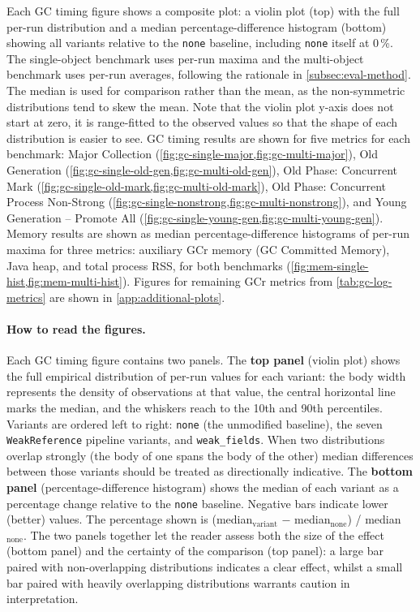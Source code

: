 Each \ac{GC} timing figure shows a composite plot: a violin plot (top) with the full per-run distribution and a median percentage-difference histogram (bottom) showing all variants relative to the \texttt{none} baseline, including \texttt{none} itself at 0\,\%. The single-object benchmark uses per-run maxima and the multi-object benchmark uses per-run averages, following the rationale in \cref{subsec:eval-method}. The median is used for comparison rather than the mean, as the non-symmetric distributions tend to skew the mean. Note that the violin plot y-axis does not start at zero, it is range-fitted to the observed values so that the shape of each distribution is easier to see. \ac{GC} timing results are shown for five metrics for each benchmark: Major Collection (\cref{fig:gc-single-major,fig:gc-multi-major}), Old Generation (\cref{fig:gc-single-old-gen,fig:gc-multi-old-gen}), Old Phase: Concurrent Mark (\cref{fig:gc-single-old-mark,fig:gc-multi-old-mark}), Old Phase: Concurrent Process Non-Strong (\cref{fig:gc-single-nonstrong,fig:gc-multi-nonstrong}), and Young Generation -- Promote All (\cref{fig:gc-single-young-gen,fig:gc-multi-young-gen}). Memory results are shown as median percentage-difference histograms of per-run maxima for three metrics: auxiliary \ac{GCr} memory (GC Committed Memory), Java heap, and total process \ac{RSS}, for both benchmarks (\cref{fig:mem-single-hist,fig:mem-multi-hist}). Figures for remaining \ac{GCr} metrics from \cref{tab:gc-log-metrics} are shown in \cref{app:additional-plots}.

\paragraph{How to read the figures.}
Each \ac{GC} timing figure contains two panels. The \textbf{top panel} (violin plot) shows the full empirical distribution of per-run values for each variant: the body width represents the density of observations at that value, the central horizontal line marks the median, and the whiskers reach to the 10th and 90th percentiles. Variants are ordered left to right: \texttt{none} (the unmodified baseline), the seven \texttt{WeakReference} pipeline variants, and \texttt{weak\_fields}. When two distributions overlap strongly (the body of one spans the body of the other) median differences between those variants should be treated as directionally indicative. The \textbf{bottom panel} (percentage-difference histogram) shows the median of each variant as a percentage change relative to the \texttt{none} baseline. Negative bars indicate lower (better) values. The percentage shown is (median$_{\mathrm{variant}}$ $-$ median$_{\mathrm{none}}$) / median$_{\mathrm{none}}$. The two panels together let the reader assess both the size of the effect (bottom panel) and the certainty of the comparison (top panel): a large bar paired with non-overlapping distributions indicates a clear effect, whilst a small bar paired with heavily overlapping distributions warrants caution in interpretation.

